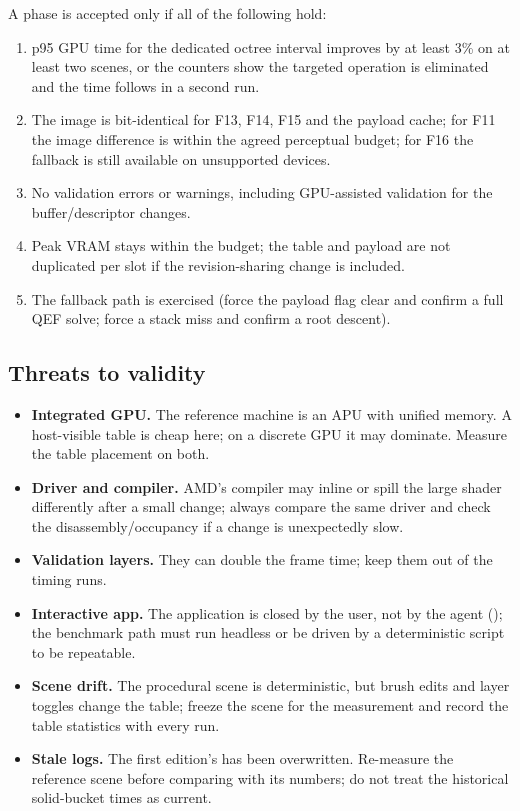 \documentclass[11pt,a4paper]{article}
\DeclareRobustCommand{\fpath}[1]{\path{#1}}
\theoremstyle{plain}
\theoremstyle{definition}
\theoremstyle{remark}
\begin{document}
A phase is accepted only if all of the following hold:
\begin{enumerate}[leftmargin=1.4em,itemsep=1pt]
\item p95 GPU time for the dedicated octree interval improves by at least 3\%
      on at least two scenes, or the counters show the targeted operation is
      eliminated and the time follows in a second run.
\item The image is bit-identical for F13, F14, F15 and the payload cache; for
      F11 the image difference is within the agreed perceptual budget; for F16
      the fallback is still available on unsupported devices.
\item No validation errors or warnings, including GPU-assisted validation for
      the buffer/descriptor changes.
\item Peak VRAM stays within the budget; the table and payload are not
      duplicated per slot if the revision-sharing change is included.
\item The fallback path is exercised (force the payload flag clear and confirm
      a full QEF solve; force a stack miss and confirm a root descent).
\end{enumerate}

\subsection{Threats to validity}

\begin{itemize}[leftmargin=1.3em,itemsep=1pt]
\item \textbf{Integrated GPU.} The reference machine is an APU with unified
      memory. A host-visible table is cheap here; on a discrete GPU it may
      dominate. Measure the table placement on both.
\item \textbf{Driver and compiler.} AMD's compiler may inline or spill the
      large shader differently after a small change; always compare the same
      driver and check the disassembly/occupancy if a change is unexpectedly
      slow.
\item \textbf{Validation layers.} They can double the frame time; keep them
      out of the timing runs.
\item \textbf{Interactive app.} The application is closed by the user, not by
      the agent (\fpath{AGENTS.md}); the benchmark path must run headless or be
      driven by a deterministic script to be repeatable.
\item \textbf{Scene drift.} The procedural scene is deterministic, but brush
      edits and layer toggles change the table; freeze the scene for the
      measurement and record the table statistics with every run.
\item \textbf{Stale logs.} The first edition's \fpath{logs/run.log} has been
      overwritten. Re-measure the reference scene before comparing with its
      numbers; do not treat the historical solid-bucket times as current.
\end{itemize}
\end{document}
